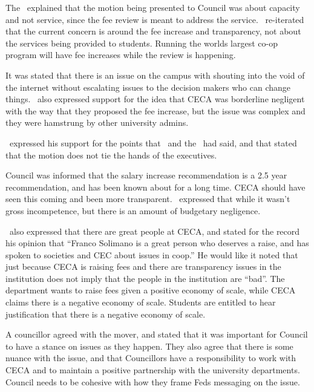 \begin{motion}
    The \vped\ explained that the motion being presented to Council was about
    capacity and not service, since the fee review is meant to address the
    service. \coopcom\ re-iterated that the current concern is around the fee
    increase and transparency, not about the services being provided to
    students. Running the worlds largest co-op program will have fee increases
    while the review is happening. 

    It was stated that there is an issue on the campus with shouting into the
    void of the internet without escalating issues to the decision makers who
    can change things. \coopcom\ also expressed support for the idea that CECA
    was borderline negligent with the way that they proposed the fee increase,
    but the issue was complex and they were hamstrung by other university
    admins. 
    
    \seneca\ expressed his support for the points that \coopcom\ and the \vped\
    had said, and that stated that the motion does not tie the hands of the
    executives.

    Council was informed that the salary increase recommendation is a 2.5 year 
    recommendation, and has been known about for a long time. CECA should have
    seen this coming and been more transparent. \seneca\ expressed that while
    it wasn't gross incompetence, but there is an amount of budgetary
    negligence. 
    
    \seneca\ also expressed that there are great people at CECA, and stated
    for the record his opinion that ``Franco Solimano is a great person who 
    deserves a raise, and has spoken to societies and CEC about issues in 
    coop.'' He would like it noted that just because CECA is raising fees and
    there are transparency issues in the institution does not imply that 
    the people in the institution are ``bad''. The department wants to raise
    fees given a positive economy of scale, while CECA claims there is a
    negative economy of scale. Students are entitled to hear justification that 
    there is a negative economy of scale. 

    A councillor agreed with the mover, and stated that it was important for
    Council to have a stance on issues as they happen. They also agree that
    there is some nuance with the issue, and that Councillors have a 
    responsibility to work with CECA and to maintain a positive partnership
    with the university departments. Council needs to be cohesive with how they
    frame Feds messaging on the issue.


\end{motion}
